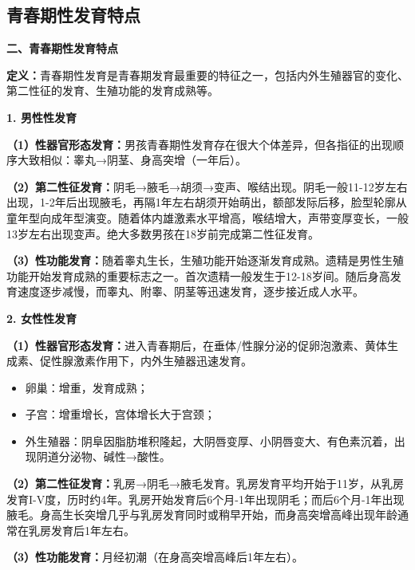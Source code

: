 \subsection{青春期性发育特点}

\begin{defbox}
\textbf{二、青春期性发育特点}

\textbf{定义：}青春期性发育是青春期发育最重要的特征之一，包括内外生殖器官的变化、第二性征的发育、生殖功能的发育成熟等。
\end{defbox}

\begin{keybox}
\textbf{1. 男性性发育}

\textbf{（1）性器官形态发育：}男孩青春期性发育存在很大个体差异，但各指征的出现顺序大致相似：睾丸→阴茎、身高突增（一年后）。

\textbf{（2）第二性征发育：}阴毛→腋毛→胡须→变声、喉结出现。阴毛一般11-12岁左右出现，1-2年后出现腋毛，再隔1年左右胡须开始萌出，额部发际后移，脸型轮廓从童年型向成年型演变。随着体内雄激素水平增高，喉结增大，声带变厚变长，一般13岁左右出现变声。绝大多数男孩在18岁前完成第二性征发育。

\vspace{3pt}
\begin{center}
\end{center}
\vspace{3pt}

\textbf{（3）性功能发育：}随着睾丸生长，生殖功能开始逐渐发育成熟。遗精是男性生殖功能开始发育成熟的重要标志之一。首次遗精一般发生于12-18岁间。随后身高发育速度逐步减慢，而睾丸、附睾、阴茎等迅速发育，逐步接近成人水平。

\textbf{2. 女性性发育}

\textbf{（1）性器官形态发育：}进入青春期后，在垂体/性腺分泌的促卵泡激素、黄体生成素、促性腺激素作用下，内外生殖器迅速发育。
\begin{itemize}[leftmargin=*]
    \item 卵巢：增重，发育成熟；
    \item 子宫：增重增长，宫体增长大于宫颈；
    \item 外生殖器：阴阜因脂肪堆积隆起，大阴唇变厚、小阴唇变大、有色素沉着，出现阴道分泌物、碱性→酸性。
\end{itemize}

\textbf{（2）第二性征发育：}乳房→阴毛→腋毛发育。乳房发育平均开始于11岁，从乳房发育I-V度，历时约4年。乳房开始发育后6个月-1年出现阴毛；而后6个月-1年出现腋毛。身高生长突增几乎与乳房发育同时或稍早开始，而身高突增高峰出现年龄通常在乳房发育后1年左右。

\textbf{（3）性功能发育：}月经初潮（在身高突增高峰后1年左右）。
\end{keybox}

